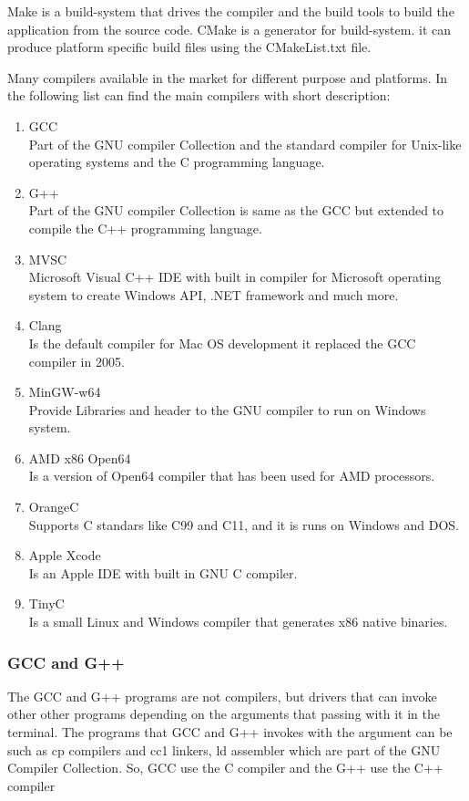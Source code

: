 \documentclass[12pt]{article}
\begin{document}
{ Make is a build-system that drives the compiler and the build tools to build the application from the source code. CMake is a generator for build-system. it can produce platform specific build files using the CMakeList.txt file.\\

{\setlength{\parindent}{0cm}
Many compilers available in the market for different purpose and platforms. In the following list can find the main compilers with short description:\cite{Heng} 
\begin{enumerate}
\item GCC\\
Part of the GNU compiler Collection and the standard compiler for Unix-like operating systems and the C programming language. 
\item G++\\
Part of the GNU compiler Collection is same as the GCC but extended to compile the C++ programming language.
\item MVSC\\
Microsoft Visual C++ IDE with built in compiler for Microsoft operating system to create Windows API, .NET framework and much more.
\item Clang\\
Is the default compiler for Mac OS development it replaced the GCC compiler in 2005.
\item MinGW-w64\\
Provide Libraries and header to the GNU compiler to run on Windows system.
\item AMD x86 Open64\\
Is a version of Open64 compiler that has been used for AMD processors.
\item OrangeC\\
Supports C standars like C99 and C11, and it is runs on Windows and DOS.
\item Apple Xcode\\
Is an Apple IDE with built in GNU C compiler.
\item TinyC\\
Is a small Linux and Windows compiler that generates x86 native binaries.
\end{enumerate}
}
\subsubsection{GCC and G++}
The GCC and G++ programs are not compilers, but drivers that can invoke other other programs depending on the arguments that passing with it in the terminal. The programs that GCC and G++ invokes with the argument can be such as cp compilers and cc1 linkers, ld assembler which are part of the GNU Compiler Collection. So, GCC use the C compiler and the G++ use the C++ compiler\cite{Rohan} 

}
\end{document}

